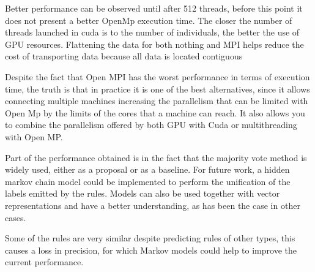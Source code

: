 \documentclass{IEEEtran}
\begin{document}
Better performance can be observed until after 512 threads, before this point it does not present a better OpenMp execution time. The closer the number of threads launched in cuda is to the number of individuals, the better the use of GPU resources. Flattening the data for both nothing and MPI helps reduce the cost of transporting data because all data is located contiguous

Despite the fact that Open MPI has the worst performance in terms of execution time, the truth is that in practice it is one of the best alternatives, since it allows connecting multiple machines increasing the parallelism that can be limited with Open Mp by the limits of the cores that a machine can reach. It also allows you to combine the parallelism offered by both GPU with Cuda or multithreading with Open MP.

Part of the performance obtained is in the fact that the majority vote method is widely used, either as a proposal or as a baseline. For future work, a hidden markov chain model could be implemented to perform the unification of the labels emitted by the rules. Models can also be used together with vector representations and have a better understanding, as has been the case in other cases.

Some of the rules are very similar despite predicting rules of other types, this causes a loss in precision, for which Markov models could help to improve the current performance.






\end{document}
